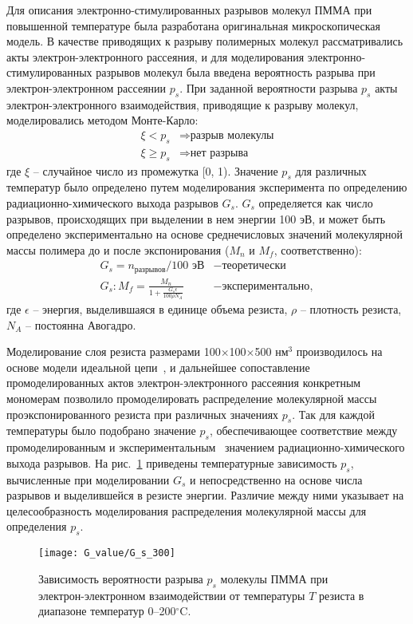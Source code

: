 Для описания электронно-стимулированных разрывов молекул ПММА при повышенной температуре была разработана оригинальная микроскопическая модель. В качестве приводящих к разрыву полимерных молекул рассматривались акты электрон-электронного рассеяния, и для моделирования электронно-стимулированных разрывов молекул была введена вероятность разрыва при электрон-электронном рассеянии $p_s$. При заданной вероятности разрыва $p_s$ акты электрон-электронного взаимодействия, приводящие к разрыву молекул, моделировались методом Монте-Карло:
\begin{equation} \label{eq:MC_9}
	\begin{aligned}
		\xi < p_s & \Rightarrow \text{разрыв молекулы} \\
		\xi \geq p_s & \Rightarrow \text{нет разрыва}
	\end{aligned}
\end{equation}
где $\xi$ -- случайное число из промежутка [0, 1). Значение $p_s$ для различных температур было определено путем моделирования эксперимента по определению радиационно-химического выхода разрывов $G_s$. $G_s$ определяется как число разрывов,  происходящих при выделении в нем энергии 100 эВ, и может быть определено экспериментально на основе среднечисловых значений молекулярной массы полимера до и после экспонирования ($M_n$ и $M_f$, соответственно):
\begin{equation}
	\begin{aligned}
		G_s = n_{\text{разрывов}} / 100 \text{ эВ} & - \text{теоретически} \\
		G_s: M_f = \frac{\displaystyle M_n}{1 + \frac{\displaystyle G_s \epsilon}{\displaystyle 100 \rho N_A}}& - \text{экспериментально},
	\end{aligned}
\end{equation}
где $\epsilon$ -- энергия, выделившаяся в единице объема резиста, $\rho$ -- плотность резиста, $N_A$  -- постоянна Авогадро.

Моделирование слоя резиста размерами 100$\times$100$\times$500 нм$^3$ производилось на основе модели идеальной цепи~\cite{Han_2002}, и дальнейшее сопоставление промоделированных актов электрон-электронного рассеяния конкретным мономерам позволило промоделировать распределение молекулярной массы проэкспонированного резиста при различных значениях $p_s$. Так для каждой температуры было подобрано значение $p_s$, обеспечивающее соответствие между промоделированным и экспериментальным~\cite{Charlesby_1964_Gs} значением радиационно-химического выхода разрывов. На рис.~\ref{fig:P_s} приведены температурные зависимость $p_s$, вычисленные при моделировании $G_s$ и непосредственно на основе числа разрывов и выделившейся в резисте энергии. Различие между ними указывает на целесообразность моделирования распределения молекулярной массы для определения $p_s$.
\begin{figure}[t]
	\centering
	\texttt{[image: G\_value/G\_s\_300]}
	\caption{Зависимость вероятности разрыва $p_s$ молекулы ПММА при электрон-электронном взаимодействии от температуры $T$ резиста в диапазоне температур 0--200$^\circ$C.\vspace{1.5em}}
	\label{fig:P_s}
\end{figure}

